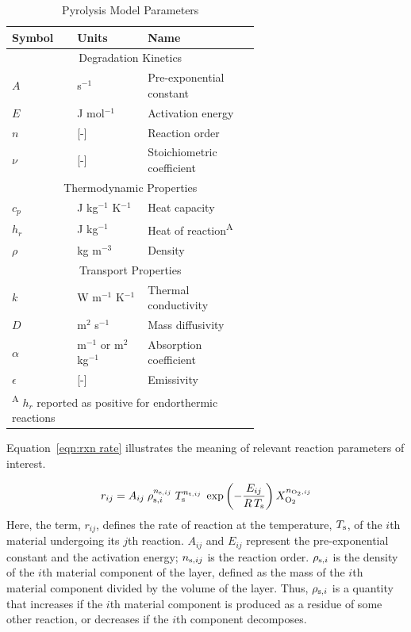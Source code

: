 \documentclass[12pt]{article}
\begin{document}
\begin{table}[htb]
\centering
\caption{ Pyrolysis Model Parameters}
\label{table:properties}
\begin{tabular}{p{0.125\linewidth} | p{0.2\linewidth}| p{0.3\linewidth}}
\hline
\textbf{Symbol}         & \textbf{Units} & \textbf{Name}\\
\hline
\multicolumn{3}{c}{Degradation Kinetics}\\
\hline
$A$ &s$^{-1}$   &Pre-exponential constant \\
$E$ &J mol$^{-1}$ &Activation energy \\
$n$ &[-]    &Reaction order\\
$\nu$ &[-]    &Stoichiometric coefficient\\
\hline
\multicolumn{3}{c}{Thermodynamic Properties}\\
\hline
$c_p$ &J kg$^{-1}$ K$^{-1}$ &Heat capacity\\
$h_r$ &J kg$^{-1}$    &Heat of reaction\textsuperscript{A}\\
$\rho$  &kg m$^{-3}$    &Density\\
\hline
\multicolumn{3}{c}{Transport Properties}\\
\hline
$k$ &W m$^{-1}$ K$^{-1}$  &Thermal conductivity\\
$D$ &m$^2$ s$^{-1}$   &Mass diffusivity\\
$\alpha$  &m$^{-1}$ or m$^2$ kg$^{-1}$  &Absorption coefficient\\
$\epsilon$  &[-]        &Emissivity\\
\hline
\multicolumn{3}{l}{\textsuperscript{A} $h_r$ reported as positive for endorthermic reactions}
\end{tabular}
\end{table}


\noindent Equation~\ref{eqn:rxn rate} illustrates the meaning of relevant reaction parameters of interest.

\begin{equation}   \label{eqn:rxn rate}
  r_{ij} = A_{ij} \; \rho_{{\rm s},i}^{n_{{\rm s},ij}} \;  T_{\rm s}^{n_{{\rm t},ij}} \; \exp \left(-\frac{E_{ij}}{R \, T_{\rm s}} \right) X_{\rm O_2}^{n_{{\rm O_2},ij}}
\end{equation}
Here, the term, $r_{ij}$, defines the rate of reaction at the temperature, $T_{\rm s}$, of the $i$th material undergoing its $j$th reaction. $A_{ij}$ and $E_{ij}$ represent the pre-exponential constant and the activation energy; $n_{{\rm s},ij}$ is the reaction order. $\rho_{{\rm s},i}$ is the density of the $i$th material component of the layer, defined as the mass of the $i$th material component divided by the volume of the layer. Thus, $\rho_{{\rm s},i}$ is a quantity that increases if the $i$th material component is produced as a residue of some other reaction, or decreases if the $i$th component decomposes.
\end{document}
